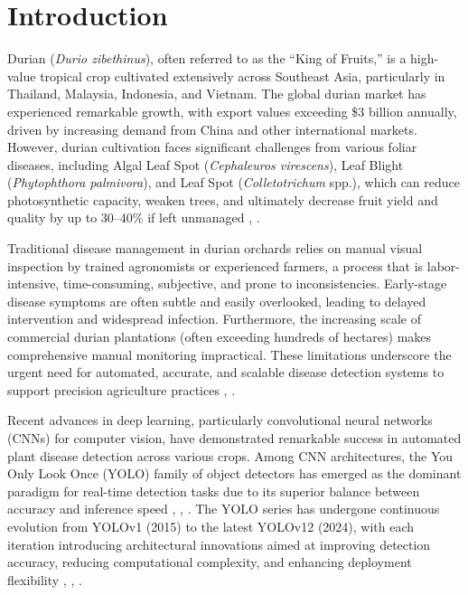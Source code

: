 \section{Introduction}

Durian (\textit{Durio zibethinus}), often referred to as the ``King of Fruits,'' is a high-value tropical crop cultivated extensively across Southeast Asia, particularly in Thailand, Malaysia, Indonesia, and Vietnam. The global durian market has experienced remarkable growth, with export values exceeding \$3 billion annually, driven by increasing demand from China and other international markets. However, durian cultivation faces significant challenges from various foliar diseases, including Algal Leaf Spot (\textit{Cephaleuros virescens}), Leaf Blight (\textit{Phytophthora palmivora}), and Leaf Spot (\textit{Colletotrichum} spp.), which can reduce photosynthetic capacity, weaken trees, and ultimately decrease fruit yield and quality by up to 30--40\% if left unmanaged \cite{50}, \cite{51}.

Traditional disease management in durian orchards relies on manual visual inspection by trained agronomists or experienced farmers, a process that is labor-intensive, time-consuming, subjective, and prone to inconsistencies. Early-stage disease symptoms are often subtle and easily overlooked, leading to delayed intervention and widespread infection. Furthermore, the increasing scale of commercial durian plantations (often exceeding hundreds of hectares) makes comprehensive manual monitoring impractical. These limitations underscore the urgent need for automated, accurate, and scalable disease detection systems to support precision agriculture practices \cite{52}, \cite{53}.

Recent advances in deep learning, particularly convolutional neural networks (CNNs) for computer vision, have demonstrated remarkable success in automated plant disease detection across various crops. Among CNN architectures, the You Only Look Once (YOLO) family of object detectors has emerged as the dominant paradigm for real-time detection tasks due to its superior balance between accuracy and inference speed \cite{17}, \cite{21}, \cite{29}. The YOLO series has undergone continuous evolution from YOLOv1 (2015) to the latest YOLOv12 (2024), with each iteration introducing architectural innovations aimed at improving detection accuracy, reducing computational complexity, and enhancing deployment flexibility \cite{30}, \cite{31}, \cite{32}.

